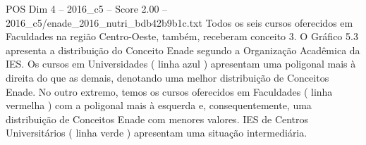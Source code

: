 \begin{textsample}{POS Dim 4 – 2016\_c5 – Score 2.00 – 2016\_c5/enade\_2016\_nutri\_bdb42b9b1c.txt}
Todos os seis cursos oferecidos em Faculdades na região Centro-Oeste, também, receberam conceito 3.
O Gráfico 5.3 apresenta a distribuição do Conceito Enade segundo a Organização Acadêmica da IES.
Os cursos em Universidades ( linha azul ) apresentam uma poligonal mais à direita do que as demais, denotando uma melhor distribuição de Conceitos Enade.
No outro extremo, temos os cursos oferecidos em Faculdades ( linha vermelha ) com a poligonal mais à esquerda e, consequentemente, uma distribuição de Conceitos Enade com menores valores.
IES de Centros Universitários ( linha verde ) apresentam uma situação intermediária.

\end{textsample}
